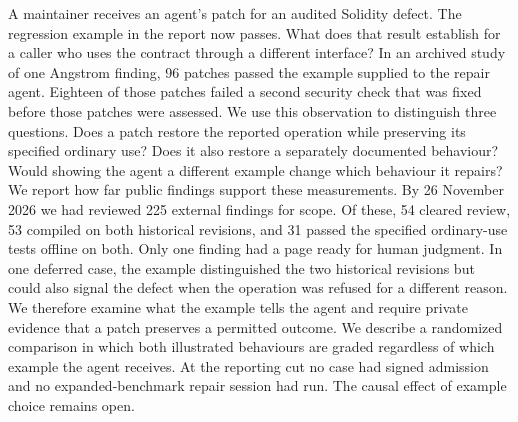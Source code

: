 A maintainer receives an agent's patch for an audited Solidity defect. The regression example in the report now passes. What does that result establish for a caller who uses the contract through a different interface? In an archived study of one Angstrom finding, 96 patches passed the example supplied to the repair agent. Eighteen of those patches failed a second security check that was fixed before those patches were assessed. We use this observation to distinguish three questions. Does a patch restore the reported operation while preserving its specified ordinary use? Does it also restore a separately documented behaviour? Would showing the agent a different example change which behaviour it repairs? We report how far public findings support these measurements. By 26 November 2026 we had reviewed 225 external findings for scope. Of these, 54 cleared review, 53 compiled on both historical revisions, and 31 passed the specified ordinary-use tests offline on both. Only one finding had a page ready for human judgment. In one deferred case, the example distinguished the two historical revisions but could also signal the defect when the operation was refused for a different reason. We therefore examine what the example tells the agent and require private evidence that a patch preserves a permitted outcome. We describe a randomized comparison in which both illustrated behaviours are graded regardless of which example the agent receives. At the reporting cut no case had signed admission and no expanded-benchmark repair session had run. The causal effect of example choice remains open.
